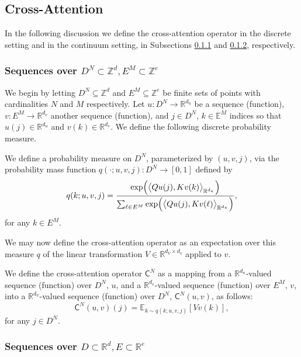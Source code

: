 \documentclass[twoside]{article}
\newcommand{\1}{\mathbbm{1}}
\newcommand{\R}{\mathbbm{R}}
\newcommand{\Z}{\mathbbm{Z}}
\newcommand{\sC}{\mathsf{C}}
\newcommand{\dK}{d_\textrm{\scalebox{.7}{$K$}}}
\newcommand{\ec}[1]{{\color{blue}{#1}}}
\providecommand{\mathbbm}{\mathbb} %
\newcommand{\E}{\mathbb{E}}
\begin{document}
\subsection{Cross-Attention}
\label{subsec:cross-attention}

In the following discussion we define the cross-attention operator in the discrete setting and in the continuum setting, in Subsections \ref{subsubsec:cross-attention_discrete} and \ref{subsubsec:cross-attention_cont}, respectively. 



\subsubsection{Sequences over \texorpdfstring{$D^N \subset \Z^d,E^M\subset\Z^e$}{} }
\label{subsubsec:cross-attention_discrete}

We begin by letting $D^N \subseteq \Z^d$ and $E^M \subseteq \Z^e$ be finite sets of points with cardinalities $N$ and $M$
respectively. Let $u: D^N \to \R^{d_u}$ be a sequence (function),
$v: E^M \to \R^{d_v}$ another sequence (function), and $j \in D^N$, $k \in \E^M$ indices so that $u(j)\in\R^{d_u}$ and $v(k)\in \R^{d_v}$. We define the following discrete probability measure.
\begin{definition}
\label{d:5}
We define a probability measure on $D^N$, parameterized by $(u,v,j)$, via the probability mass function
$q(\cdot;u,v,j): D^N \to [0,1]$ defined by
\[q(k; u,v, j) = \frac{\mathrm{exp} \Big ( \big\langle Q u(j), K v(k) \big\rangle_{\R^{\dK}} \Big )}{\sum_{\ell \in E^M} \mathrm{exp} \Big ( \big\langle Q u(j), K v(\ell)\big\rangle_{\R^{\dK}} \Big )},\]
for any $k \in E^M$.
\end{definition}
We may now define the cross-attention operator as an expectation over this measure $q$ of the linear transformation $V\in \R^{d_V\times d_v}$ applied to $v$.
\begin{definition}
\label{d:6}
We define the cross-attention operator $\sC^N$ as a mapping from a $\R^{d_u}$-valued sequence (function) over $D^N$, $u$, 
and a $\R^{d_v}$-valued sequence (function) over $E^M$, $v$, into a $\R^{d_V}$-valued sequence (function) over $D^N$, $\sC^N(u,v)$, as follows:
\[\sC^N(u,v)(j) = \E_{k \sim q(k;u,v,j)} [V v(k)],\]
for any $j\in D^N$.
\end{definition}

\subsubsection{Sequences over \texorpdfstring{$D \subset \R^d, E\subset \R^e$}{}}
\label{subsubsec:cross-attention_cont}
\end{document}
